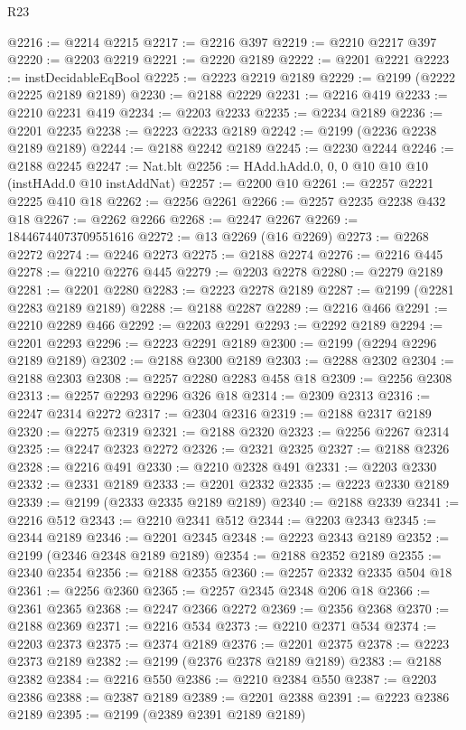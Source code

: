 \begin{lexlean}{R23}
\begin{coremodule}
@2216 := @2214 @2215
@2217 := @2216 @397
@2219 := @2210 @2217 @397
@2220 := @2203 @2219
@2221 := @2220 @2189
@2222 := @2201 @2221
@2223 := instDecidableEqBool
@2225 := @2223 @2219 @2189
@2229 := @2199 (@2222 @2225 @2189 @2189)
@2230 := @2188 @2229
@2231 := @2216 @419
@2233 := @2210 @2231 @419
@2234 := @2203 @2233
@2235 := @2234 @2189
@2236 := @2201 @2235
@2238 := @2223 @2233 @2189
@2242 := @2199 (@2236 @2238 @2189 @2189)
@2244 := @2188 @2242 @2189
@2245 := @2230 @2244
@2246 := @2188 @2245
@2247 := Nat.blt
@2256 := HAdd.hAdd.{0, 0, 0} @10 @10 @10 (instHAdd.{0} @10 instAddNat)
@2257 := @2200 @10
@2261 := @2257 @2221 @2225 @410 @18
@2262 := @2256 @2261
@2266 := @2257 @2235 @2238 @432 @18
@2267 := @2262 @2266
@2268 := @2247 @2267
@2269 := 18446744073709551616
@2272 := @13 @2269 (@16 @2269)
@2273 := @2268 @2272
@2274 := @2246 @2273
@2275 := @2188 @2274
@2276 := @2216 @445
@2278 := @2210 @2276 @445
@2279 := @2203 @2278
@2280 := @2279 @2189
@2281 := @2201 @2280
@2283 := @2223 @2278 @2189
@2287 := @2199 (@2281 @2283 @2189 @2189)
@2288 := @2188 @2287
@2289 := @2216 @466
@2291 := @2210 @2289 @466
@2292 := @2203 @2291
@2293 := @2292 @2189
@2294 := @2201 @2293
@2296 := @2223 @2291 @2189
@2300 := @2199 (@2294 @2296 @2189 @2189)
@2302 := @2188 @2300 @2189
@2303 := @2288 @2302
@2304 := @2188 @2303
@2308 := @2257 @2280 @2283 @458 @18
@2309 := @2256 @2308
@2313 := @2257 @2293 @2296 @326 @18
@2314 := @2309 @2313
@2316 := @2247 @2314 @2272
@2317 := @2304 @2316
@2319 := @2188 @2317 @2189
@2320 := @2275 @2319
@2321 := @2188 @2320
@2323 := @2256 @2267 @2314
@2325 := @2247 @2323 @2272
@2326 := @2321 @2325
@2327 := @2188 @2326
@2328 := @2216 @491
@2330 := @2210 @2328 @491
@2331 := @2203 @2330
@2332 := @2331 @2189
@2333 := @2201 @2332
@2335 := @2223 @2330 @2189
@2339 := @2199 (@2333 @2335 @2189 @2189)
@2340 := @2188 @2339
@2341 := @2216 @512
@2343 := @2210 @2341 @512
@2344 := @2203 @2343
@2345 := @2344 @2189
@2346 := @2201 @2345
@2348 := @2223 @2343 @2189
@2352 := @2199 (@2346 @2348 @2189 @2189)
@2354 := @2188 @2352 @2189
@2355 := @2340 @2354
@2356 := @2188 @2355
@2360 := @2257 @2332 @2335 @504 @18
@2361 := @2256 @2360
@2365 := @2257 @2345 @2348 @206 @18
@2366 := @2361 @2365
@2368 := @2247 @2366 @2272
@2369 := @2356 @2368
@2370 := @2188 @2369
@2371 := @2216 @534
@2373 := @2210 @2371 @534
@2374 := @2203 @2373
@2375 := @2374 @2189
@2376 := @2201 @2375
@2378 := @2223 @2373 @2189
@2382 := @2199 (@2376 @2378 @2189 @2189)
@2383 := @2188 @2382
@2384 := @2216 @550
@2386 := @2210 @2384 @550
@2387 := @2203 @2386
@2388 := @2387 @2189
@2389 := @2201 @2388
@2391 := @2223 @2386 @2189
@2395 := @2199 (@2389 @2391 @2189 @2189)

\end{coremodule}
\end{lexlean}
